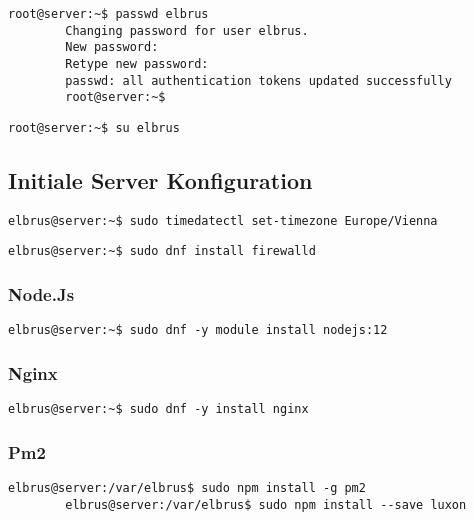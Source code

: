 \documentclass{article}
\begin{document}
	\lstset{style=commands}
	\begin{lstlisting}[caption={Ändern des Passwords für den User Elbrus.}]
		root@server:~$ passwd elbrus
		Changing password for user elbrus.
		New password:
		Retype new password:
		passwd: all authentication tokens updated successfully
		root@server:~$
	\end{lstlisting}

	\lstset{style=commands}
	\begin{lstlisting}[caption={Wechseln zu User elbrus.}]
		root@server:~$ su elbrus
	\end{lstlisting}
	\newpage
	
	\subsection{Initiale Server Konfiguration}

	\lstset{style=commands}
	\begin{lstlisting}[caption={Setzen der Zeitzone auf 'Europa/Wien'.}]
		elbrus@server:~$ sudo timedatectl set-timezone Europe/Vienna
	\end{lstlisting}

	\lstset{style=commands}
	\begin{lstlisting}[caption={Installieren von dem 'firewalld' Service.}]
		elbrus@server:~$ sudo dnf install firewalld
	\end{lstlisting}
	
	\subsubsection{Node.Js}
	
	\lstset{style=commands}
	\begin{lstlisting}[caption={Installieren des Framworks 'Node.Js'.}]
		elbrus@server:~$ sudo dnf -y module install nodejs:12
	\end{lstlisting}

	\subsubsection{Nginx}
	
	\lstset{style=commands}
	\begin{lstlisting}[caption={Installieren der Webserver-Software 'Nginx'.}]
		elbrus@server:~$ sudo dnf -y install nginx
	\end{lstlisting}

	\subsubsection{Pm2}
		\lstset{style=commands}
	\begin{lstlisting}[caption={Installieren von 'pm2'.}]
		elbrus@server:/var/elbrus$ sudo npm install -g pm2
		elbrus@server:/var/elbrus$ sudo npm install --save luxon
	\end{lstlisting}
	
\end{document}
